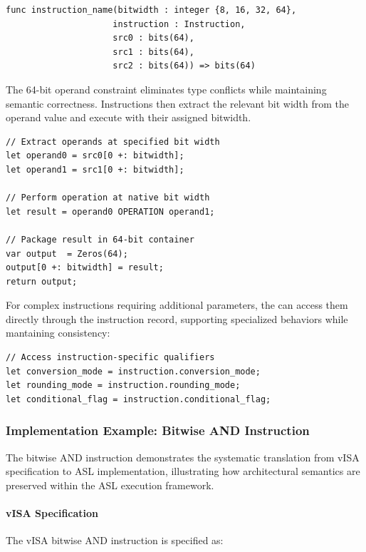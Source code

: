 \begin{lstlisting}[caption={Standard ASL Instruction Function Signature}, label={lst:standard_signature}]
func instruction_name(bitwidth : integer {8, 16, 32, 64},
                     instruction : Instruction,
                     src0 : bits(64),
                     src1 : bits(64),
                     src2 : bits(64)) => bits(64)
\end{lstlisting}
The 64-bit operand constraint eliminates type conflicts while maintaining
semantic correctness. Instructions then extract the relevant bit width from the
operand value and execute with their assigned bitwidth.

\begin{lstlisting}[caption={Bit Width Extraction Pattern}, label={lst:bit_extraction}]
// Extract operands at specified bit width
let operand0 = src0[0 +: bitwidth];
let operand1 = src1[0 +: bitwidth];

// Perform operation at native bit width
let result = operand0 OPERATION operand1;

// Package result in 64-bit container
var output  = Zeros(64);
output[0 +: bitwidth] = result;
return output;
\end{lstlisting}

For complex instructions requiring additional parameters, the can access them
directly through the instruction record, supporting specialized behaviors while
mantaining consistency:

\begin{lstlisting}[caption={Instruction Parameter Access Pattern}, label={lst:param_access}]
// Access instruction-specific qualifiers
let conversion_mode = instruction.conversion_mode;
let rounding_mode = instruction.rounding_mode;
let conditional_flag = instruction.conditional_flag;
\end{lstlisting}

\subsubsection{Implementation Example: Bitwise AND Instruction}
\label{subsubsec:and_implementation}

The bitwise AND instruction demonstrates the systematic translation from vISA
specification to ASL implementation, illustrating how architectural semantics
are preserved within the ASL execution framework.

\paragraph{vISA Specification}
The vISA bitwise AND instruction is specified as:

